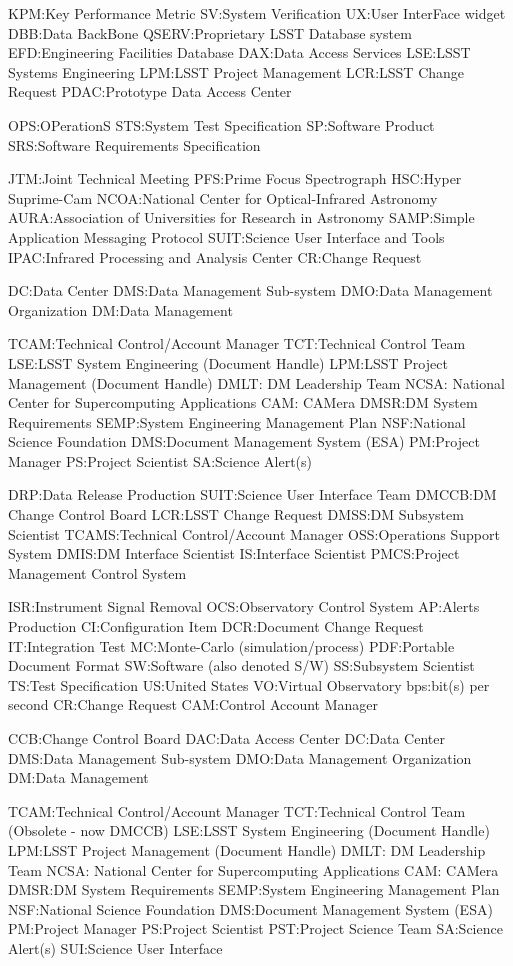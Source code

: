 KPM:Key Performance Metric
SV:System Verification
UX:User InterFace widget
DBB:Data BackBone
QSERV:Proprietary LSST Database system
EFD:Engineering Facilities Database
DAX:Data Access Services
LSE:LSST Systems Engineering
LPM:LSST Project Management
LCR:LSST Change Request
PDAC:Prototype Data Access Center

OPS:OPerationS
STS:System Test Specification
SP:Software Product
SRS:Software Requirements Specification

JTM:Joint Technical Meeting
PFS:Prime Focus Spectrograph
HSC:Hyper Suprime-Cam
NCOA:National Center for Optical-Infrared Astronomy
AURA:Association of Universities for Research in Astronomy
SAMP:Simple Application Messaging Protocol
SUIT:Science User Interface and Tools
IPAC:Infrared Processing and Analysis Center
CR:Change Request

DC:Data Center
DMS:Data Management Sub-system
DMO:Data Management Organization
DM:Data Management

TCAM:Technical Control/Account Manager
TCT:Technical Control Team
LSE:LSST System Engineering (Document Handle)
LPM:LSST Project Management (Document Handle)
DMLT: DM Leadership Team
NCSA: National Center for Supercomputing Applications
CAM: CAMera
DMSR:DM System Requirements
SEMP:System Engineering Management Plan
NSF:National Science Foundation
DMS:Document Management System (ESA)
PM:Project Manager
PS:Project Scientist
SA:Science Alert(s)

DRP:Data Release Production
SUIT:Science User Interface Team
DMCCB:DM Change Control Board
LCR:LSST Change Request
DMSS:DM Subsystem Scientist
TCAMS:Technical Control/Account Manager
OSS:Operations Support System
DMIS:DM Interface Scientist
IS:Interface Scientist
PMCS:Project Management Control System

ISR:Instrument Signal Removal
OCS:Observatory Control System
AP:Alerts Production
CI:Configuration Item
DCR:Document Change Request
IT:Integration Test
MC:Monte-Carlo (simulation/process)
PDF:Portable Document Format
SW:Software (also denoted S/W)
SS:Subsystem Scientist
TS:Test Specification
US:United States
VO:Virtual Observatory
bps:bit(s) per second
CR:Change Request
CAM:Control Account Manager

CCB:Change Control Board
DAC:Data Access Center
DC:Data Center
DMS:Data Management Sub-system
DMO:Data Management Organization
DM:Data Management

TCAM:Technical Control/Account Manager
TCT:Technical Control Team (Obsolete - now DMCCB)
LSE:LSST System Engineering (Document Handle)
LPM:LSST Project Management (Document Handle)
DMLT: DM Leadership Team
NCSA: National Center for Supercomputing Applications
CAM: CAMera
DMSR:DM System Requirements
SEMP:System Engineering Management Plan
NSF:National Science Foundation
DMS:Document Management System (ESA)
PM:Project Manager
PS:Project Scientist
PST:Project Science Team
SA:Science Alert(s)
SUI:Science User Interface
